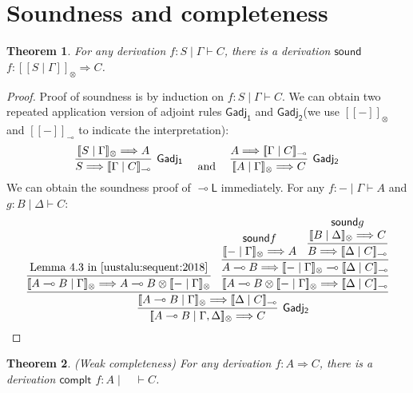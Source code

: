 \documentclass[submission,copyright,creativecommons]{eptcs}
\newtheorem{theorem}{Theorem}
\newcommand{\ldbc}{[\![}
\newcommand{\rdbc}{]\!]}
\newcommand{\ot}{\otimes}
\newcommand{\lolli}{\multimap}
\begin{document}
\section{Soundness and completeness}
\begin{theorem}
  For any derivation $f : S \mid \Gamma \vdash C$, there is a derivation $\mathsf{sound}$ $f : \ldbc S \mid \Gamma \rdbc_{\ot} \Longrightarrow C$.
\end{theorem}
\begin{proof}
  Proof of soundness is by induction on $f : S \mid \Gamma \vdash C$.
  We can obtain two repeated application version of adjoint rules $\mathsf{Gadj_1}$ and $\mathsf{Gadj_2}$(we use $\ldbc - \rdbc_{\ot}$ and $\ldbc - \rdbc_{\lolli}$ to indicate the interpretation):
  \begin{displaymath}
    \infer[\mathsf{Gadj_1}]{S \Longrightarrow \ldbc \Gamma \mid C\rdbc_{\lolli}}{\ldbc S \mid \Gamma \rdbc_{\ot} \Longrightarrow A}
    \quad
    \text{ and }
    \quad
    \infer[\mathsf{Gadj_2}]{\ldbc A \mid \Gamma \rdbc_{\ot} \Longrightarrow C}{A \Longrightarrow \ldbc \Gamma \mid C\rdbc_{\lolli}}
  \end{displaymath}
  We can obtain the soundness proof of $\multimap \mathsf{L}$ immediately.
  For any $f : - \mid \Gamma \vdash A$ and $g : B\mid \Delta \vdash C$:
  \begin{displaymath}
    \infer[\mathsf{Gadj_2}]{\ldbc A\multimap B \mid \Gamma , \Delta \rdbc_{\ot} \Longrightarrow C}{
      \infer{\ldbc A\multimap B \mid \Gamma \rdbc_{\ot} \Longrightarrow \ldbc \Delta \mid C\rdbc_{\lolli}}{
        \infer{\ldbc A\multimap B \mid \Gamma \rdbc_{\ot} \Longrightarrow A\multimap B \otimes \ldbc - \mid \Gamma \rdbc_{\ot}}{\text{Lemma 4.3 in \cite{uustalu:sequent:2018}}}
        &
        \infer{\ldbc A\multimap B \otimes \ldbc - \mid \Gamma \rdbc_{\ot} \Longrightarrow \ldbc \Delta \mid C\rdbc_{\lolli}}{
          \infer{A\multimap B \Longrightarrow \ldbc - \mid \Gamma \rdbc_{\ot} \multimap \ldbc \Delta \mid C\rdbc_{\lolli}}{
            \deduce{\ldbc - \mid \Gamma \rdbc_{\ot} \Longrightarrow A}{\mathsf{sound} f}
            &
            \infer{B \Longrightarrow \ldbc \Delta \mid C \rdbc_{\lolli}}{
              \deduce{\ldbc B \mid \Delta \rdbc_{\ot} \Longrightarrow C}{\mathsf{sound} g}
            }
          }
        }
      }
    }
  \end{displaymath}
\end{proof}
\begin{theorem}
  (Weak completeness) For any derivation $f : A\Longrightarrow C$, there is a derivation $\mathsf{complt}$ $f : A \mid \quad \vdash C$.
\end{theorem}
\end{document}

